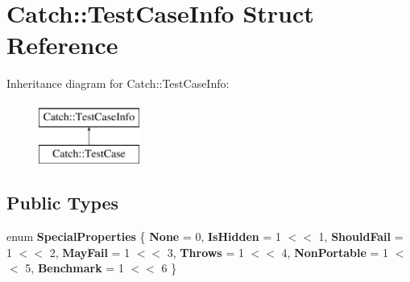 \hypertarget{struct_catch_1_1_test_case_info}{}\section{Catch\+:\+:Test\+Case\+Info Struct Reference}
\label{struct_catch_1_1_test_case_info}
Inheritance diagram for Catch\+:\+:Test\+Case\+Info\+:\begin{figure}[H]
\begin{center}
\leavevmode
\includegraphics[height=2.000000cm]{struct_catch_1_1_test_case_info}
\end{center}
\end{figure}
\subsection*{Public Types}
\begin{DoxyCompactItemize}
\item 
\mbox{\label{struct_catch_1_1_test_case_info_a39b232f74b4a7a6f2183b96759027eac}} 
enum {\bfseries Special\+Properties} \{ \newline
{\bfseries None} = 0, 
{\bfseries Is\+Hidden} = 1 $<$$<$ 1, 
{\bfseries Should\+Fail} = 1 $<$$<$ 2, 
{\bfseries May\+Fail} = 1 $<$$<$ 3, 
\newline
{\bfseries Throws} = 1 $<$$<$ 4, 
{\bfseries Non\+Portable} = 1 $<$$<$ 5, 
{\bfseries Benchmark} = 1 $<$$<$ 6
 \}
\end{DoxyCompactItemize}
